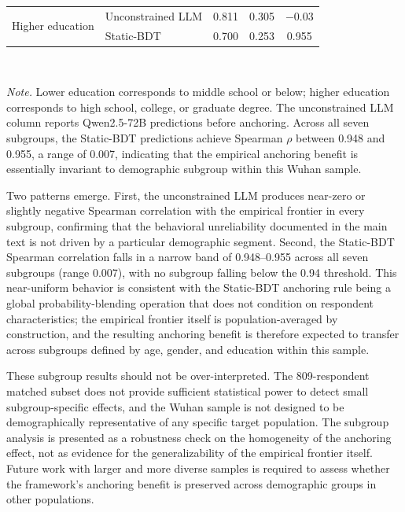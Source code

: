 \documentclass[11pt]{article}
\begin{document}
\begin{table}[h]
\begin{tabular}{l l c c c}
\midrule
\multirow{2}{*}{Higher education} & Unconstrained LLM & 0.811 & 0.305 & $-0.03$ \\
                                 & Static-BDT       & 0.700 & 0.253 & 0.955 \\
\bottomrule
\end{tabular}
\\[0.3em]
\begin{minipage}{0.95\textwidth}
\small
\textit{Note.} Lower education corresponds to middle school or below; higher education corresponds to high school, college, or graduate degree. The unconstrained LLM column reports Qwen2.5-72B predictions before anchoring. Across all seven subgroups, the Static-BDT predictions achieve Spearman $\rho$ between 0.948 and 0.955, a range of 0.007, indicating that the empirical anchoring benefit is essentially invariant to demographic subgroup within this Wuhan sample.
\end{minipage}
\end{table}

Two patterns emerge. First, the unconstrained LLM produces near-zero or slightly negative Spearman correlation with the empirical frontier in every subgroup, confirming that the behavioral unreliability documented in the main text is not driven by a particular demographic segment. Second, the Static-BDT Spearman correlation falls in a narrow band of 0.948--0.955 across all seven subgroups (range 0.007), with no subgroup falling below the 0.94 threshold. This near-uniform behavior is consistent with the Static-BDT anchoring rule being a global probability-blending operation that does not condition on respondent characteristics; the empirical frontier itself is population-averaged by construction, and the resulting anchoring benefit is therefore expected to transfer across subgroups defined by age, gender, and education within this sample.

These subgroup results should not be over-interpreted. The 809-respondent matched subset does not provide sufficient statistical power to detect small subgroup-specific effects, and the Wuhan sample is not designed to be demographically representative of any specific target population. The subgroup analysis is presented as a robustness check on the homogeneity of the anchoring effect, not as evidence for the generalizability of the empirical frontier itself. Future work with larger and more diverse samples is required to assess whether the framework's anchoring benefit is preserved across demographic groups in other populations.
\end{document}
